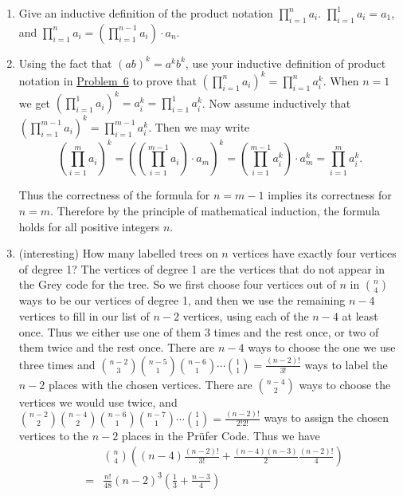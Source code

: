 \documentclass[10pt,]{book}
\theoremstyle{plain}
\theoremstyle{definition}
\numberwithin{equation}{chapter}
\newcommand{\amp}{&}
\begin{document}
\begin{enumerate}
%
\item\hypertarget{inductiveprodnotation}{}Give an inductive definition of the product notation \(\displaystyle
\prod_{i=1}^n a_i\). \(\displaystyle\prod_{i=1}^1a_i=a_1\), and \(\displaystyle\prod_{i=1}^n
a_i= \left(\prod_{i=1}^{n-1}a_i\right)\cdot a_n\).%
%
\item\hypertarget{li-46}{}Using the fact that \((ab)^k =a^kb^k\), use your inductive definition of product notation in \hyperlink{inductiveprodnotation}{Problem~6} to prove that \(\displaystyle \left(\prod_{i=1}^n a_i\right)^k=\prod_{i=1}^n a_i^k\). When \(n=1\) we get \(\displaystyle\left(\prod_{i=1}^1 a_i\right)^k=
a_i^k =\prod_{i=1}^1a_i^k\). Now assume inductively that \(\displaystyle\left(\prod_{i=1}^{m-1}a_i\right)^k=\prod_{i=1}^{m-1}a_i^k\). Then we may write%
\begin{equation*}
\left(\prod_{i=1}^ma_i\right)^k=\left(\left(\prod_{i=1}^{m-1}
a_i\right)\cdot a_m\right)^k=\left(\prod_{i=1}^{m-1}
a_i^k\right)\cdot a_m^k=\prod_{i=1}^m a_i^k.
\end{equation*}
%
\par
Thus the correctness of the formula for \(n=m-1\) implies its correctness for \(n=m\). Therefore by the principle of mathematical induction, the formula holds for all positive integers \(n\).%
%
\item\hypertarget{li-47}{}(interesting) How many labelled trees on \(n\) vertices have exactly four vertices of degree 1? The vertices of degree 1 are the vertices that do not appear in the Grey code for the tree. So we first choose four vertices out of \(n\) in \(\binom{n}{4}\) ways to be our vertices of degree 1, and then we use the remaining \(n-4\) vertices to fill in our list of \(n-2\) vertices, using each of the \(n-4\) at least once. Thus we either use one of them 3 times and the rest once, or two of them twice and the rest once. There are \(n-4\) ways to choose the one we use three times and \(\binom{n-2}{3}\binom{n-5}{1}\binom{n-6}{1}\cdots\binom{1}{1}=\frac{(n-2)!}{3!}\) ways to label the \(n-2\) places with the chosen vertices. There are \(\binom{n-4}{2}\) ways to choose the vertices we would use twice, and \(\binom{n-2}{2}\binom{n-4}{2}\binom{n-6}{1}\binom{n-7}{1}\cdots \binom{1}{1}=\frac{(n-2)!}{2!2!}\) ways to assign the chosen vertices to the \(n-2\) places in the Prüfer Code. Thus we have%
\begin{align*}
\amp \amp \binom{n}{4}\left((n-4)\frac{(n-2)!}{3!} +\frac{(n-4)(n-3)}{2}\frac{(n-2)!}{4}\right)\\
\amp =\amp \frac{n!}{48}(n-2)^{\underline{3}}\left(\frac{1}{3} +\frac{n-3}{4}\right)

\end{align*}
\end{enumerate}
\end{document}
